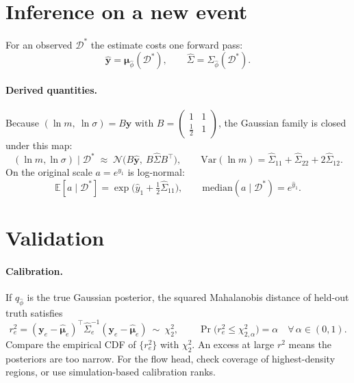 \documentclass[11pt]{article}
\theoremstyle{definition}
\newcommand{\D}{\mathcal{D}}
\newcommand{\y}{\bm{y}}
\newcommand{\E}{\mathbb{E}}
\begin{document}
\section{Inference on a new event}

For an observed $\D^\ast$ the estimate costs one forward pass:
\begin{equation}
  \hat{\y} = \bm{\mu}_{\hat\phi}(\D^\ast),\qquad \hat\Sigma = \Sigma_{\hat\phi}(\D^\ast).
\end{equation}

\paragraph{Derived quantities.}
Because $(\ln m,\ \ln\sigma) = B\y$ with
$B = \begin{pmatrix}1&1\\ \tfrac12&1\end{pmatrix}$, the Gaussian family is closed under this
map:
\begin{equation}
  (\ln m,\ln\sigma)\mid\D^\ast \;\approx\; \mathcal{N}\big(B\hat{\y},\ B\hat\Sigma B^{\top}\big),
  \qquad
  \mathrm{Var}(\ln m) = \hat\Sigma_{11}+\hat\Sigma_{22}+2\hat\Sigma_{12}.
\end{equation}
On the original scale $a=e^{y_1}$ is log-normal:
\begin{equation}
  \E[a\mid\D^\ast] = \exp\!\big(\hat y_1 + \tfrac12\hat\Sigma_{11}\big),
  \qquad
  \mathrm{median}(a\mid\D^\ast) = e^{\hat y_1}.
\end{equation}

\section{Validation}

\paragraph{Calibration.}
If $q_{\hat\phi}$ is the true Gaussian posterior, the squared Mahalanobis distance of held-out
truth satisfies
\begin{equation}
  r_e^2 = (\y_e-\hat{\bm{\mu}}_e)^{\top}\hat\Sigma_e^{-1}(\y_e-\hat{\bm{\mu}}_e)\ \sim\ \chi^2_2 ,
  \qquad
  \Pr\big(r_e^2\le\chi^2_{2,\alpha}\big)=\alpha\quad\forall\,\alpha\in(0,1).
\end{equation}
Compare the empirical CDF of $\{r_e^2\}$ with $\chi^2_2$. An excess at large $r^2$ means the
posteriors are too narrow. For the flow head, check coverage of highest-density regions, or
use simulation-based calibration ranks.
\end{document}
